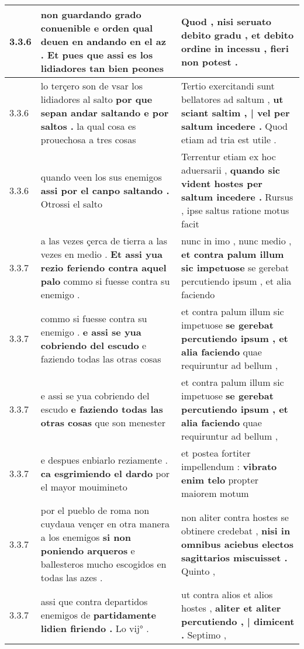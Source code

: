 \begin{tabular}{|p{1cm}|p{6.5cm}|p{6.5cm}|}
3.3.6 & non guardando grado conuenible \textbf{ e orden qual deuen en andando en el az . } Et pues que assi es los lidiadores tan bien peones & Quod , nisi seruato debito gradu , \textbf{ et debito ordine in incessu , } fieri non potest . \\\hline
3.3.6 & lo terçero son de vsar los lidiadores al salto \textbf{ por que sepan andar saltando e por saltos . } la qual cosa es prouechosa a tres cosas & Tertio exercitandi sunt bellatores ad saltum , \textbf{ ut sciant saltim , | vel per saltum incedere . } Quod etiam ad tria est utile . \\\hline
3.3.6 & quando veen los sus enemigos \textbf{ assi por el canpo saltando . } Otrossi el salto & Terrentur etiam ex hoc aduersarii , \textbf{ quando sic vident hostes per saltum incedere . } Rursus , ipse saltus ratione motus facit \\\hline
3.3.7 & a las vezes çerca de tierra a las vezes en medio . \textbf{ Et assi yua rezio feriendo contra aquel palo } commo si fuesse contra su enemigo . & nunc in imo , nunc medio , \textbf{ et contra palum illum sic impetuose } se gerebat percutiendo ipsum , et alia faciendo \\\hline
3.3.7 & commo si fuesse contra su enemigo . \textbf{ e assi se yua cobriendo del escudo } e faziendo todas las otras cosas & et contra palum illum sic impetuose \textbf{ se gerebat percutiendo ipsum , et alia faciendo } quae requiruntur ad bellum , \\\hline
3.3.7 & e assi se yua cobriendo del escudo \textbf{ e faziendo todas las otras cosas } que son menester & et contra palum illum sic impetuose \textbf{ se gerebat percutiendo ipsum , et alia faciendo } quae requiruntur ad bellum , \\\hline
3.3.7 & e despues enbiarlo reziamente . \textbf{ ca esgrimiendo el dardo } por el mayor mouimineto & et postea fortiter impellendum : \textbf{ vibrato enim telo } propter maiorem motum \\\hline
3.3.7 & por el pueblo de roma non cuydaua vençer en otra manera a los enemigos \textbf{ si non poniendo arqueros } e ballesteros mucho escogidos en todas las azes . & non aliter contra hostes se obtinere credebat , \textbf{ nisi in omnibus aciebus electos sagittarios miscuisset . } Quinto , \\\hline
3.3.7 & assi que contra departidos enemigos de \textbf{ partidamente lidien firiendo . } Lo vij° . & ut contra alios et alios hostes , \textbf{ aliter et aliter percutiendo , | dimicent . } Septimo , \\\hline

\end{tabular}
